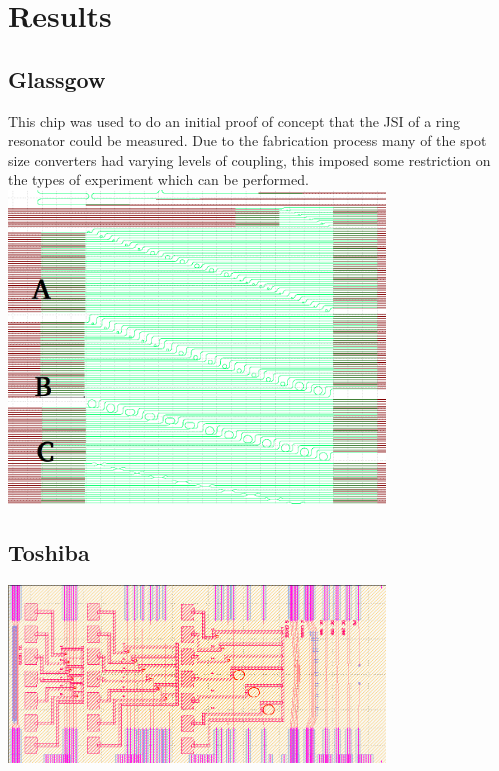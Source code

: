 \newpage
\section{Results}
\subsection{Glassgow}

This chip was used to do an initial proof of concept that the JSI of a ring resonator could be measured. Due to the fabrication process many of the spot size converters had varying levels of coupling, this imposed some restriction on the types of experiment which can be performed.
\begingroup
    \centering  
    \includegraphics[width=10cm]{img/results/glassgowChipNumbering.png}
     \vspace{3pt} \label{crossCompare}
\endgroup
\subsection{Toshiba}
\begingroup
    \centering  
    \includegraphics[width=10cm]{img/results/toshiba.png}
     \vspace{3pt} \label{crossCompare}
\endgroup
